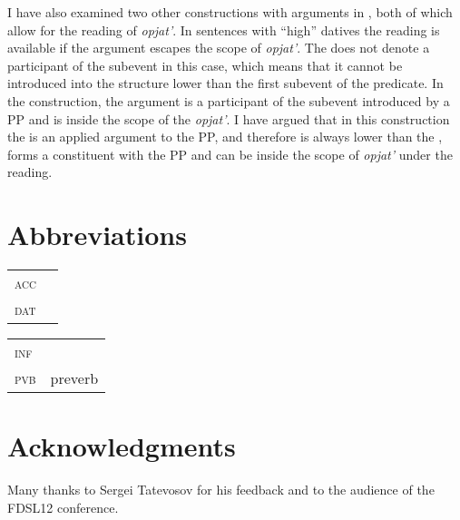 \documentclass[output=paper]{langscibook}
\begin{document}
I have also examined two other constructions with  arguments in , both of which allow for the  reading of \textit{opjat’}. In sentences with “high” datives the  reading is available if the  argument escapes the scope of \textit{opjat’}. The  does not denote a participant of the  subevent in this case, which means that it cannot be introduced into the structure lower than the first subevent of the predicate. In the   construction, the  argument is a participant of the subevent introduced by a PP and is inside the scope of the  \textit{opjat’}. I have argued that in this construction the  is an applied argument to the PP, and therefore is always lower than the , forms a constituent with the PP and can be inside the scope of \textit{opjat’} under the  reading.

\section*{Abbreviations}

\begin{tabularx}{.5\textwidth}{@{}lQ@{}}
\textsc{acc}&\\
\textsc{dat}&\\
\end{tabularx}%
\begin{tabularx}{.5\textwidth}{@{}lQ@{}}
\textsc{inf}&\\
\textsc{pvb}&preverb\\
\end{tabularx}

\section*{Acknowledgments}
Many thanks to Sergei Tatevosov for his feedback and to the audience of the FDSL12 conference.

\sloppy
\printbibliography[heading=subbibliography,notkeyword=this]
\end{document}
